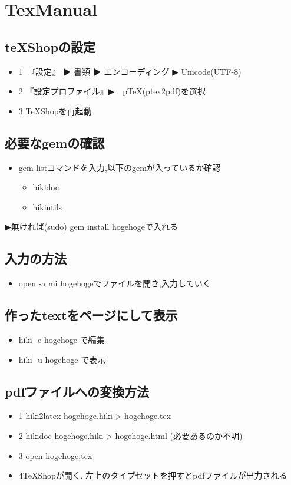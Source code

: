 \documentclass[12pt,a4paper]{jsarticle}
\begin{document}
\section{TexManual}
\subsection{teXShopの設定}\begin{itemize}
\item 1　『設定』 ▶ ︎書類 ▶ ︎エンコーディング ▶︎ Unicode(UTF-8)
\item 2  『設定プロファイル』▶︎　pTeX(ptex2pdf)を選択
\item 3  TeXShopを再起動
\end{itemize}
\subsection{必要なgemの確認}\begin{itemize}
\item gem listコマンドを入力,以下のgemが入っているか確認\begin{itemize}
\item hikidoc
\item hikiutils
\end{itemize}
\end{itemize}
▶︎︎無ければ(sudo) gem install hogehogeで入れる

\subsection{入力の方法}\begin{itemize}
\item open -a mi hogehogeでファイルを開き,入力していく
\end{itemize}
\subsection{作ったtextをページにして表示}\begin{itemize}
\item hiki -e hogehoge で編集
\item hiki -u hogehoge で表示
\end{itemize}
\subsection{pdfファイルへの変換方法}\begin{itemize}
\item 1 hiki2latex hogehoge.hiki > hogehoge.tex
\item 2 hikidoc hogehoge.hiki > hogehoge.html (必要あるのか不明)
\item 3 open hogehoge.tex
\item 4TeXShopが開く. 左上のタイプセットを押すとpdfファイルが出力される
\end{itemize}
\end{document}
